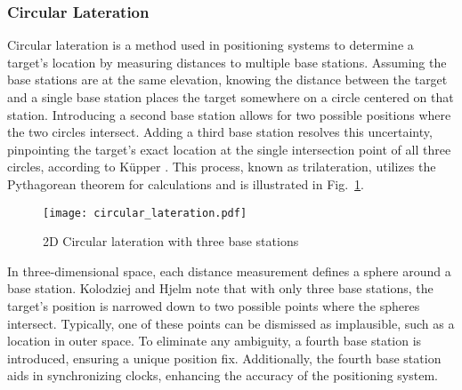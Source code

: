 \subsubsection{Circular Lateration}
Circular lateration is a method used in positioning systems to determine a target's location by measuring distances to multiple base stations. Assuming the base stations are at the same elevation, knowing the distance between the target and a single base station places the target somewhere on a circle centered on that station. Introducing a second base station allows for two possible positions where the two circles intersect. Adding a third base station resolves this uncertainty, pinpointing the target's exact location at the single intersection point of all three circles, according to K\"upper \cite{kupper2005location}. This process, known as trilateration, utilizes the Pythagorean theorem for calculations and is illustrated in Fig.~\ref{fig:circular_lateration}.

\begin{figure}[htbp]
    \centering
    \texttt{[image: circular\_lateration.pdf]}
    \caption{2D Circular lateration with three base stations \cite{kupper2005location}}
    \label{fig:circular_lateration}
\end{figure}

In three-dimensional space, each distance measurement defines a sphere around a base station. Kolodziej and Hjelm \cite{kolodziej2017local} note that with only three base stations, the target's position is narrowed down to two possible points where the spheres intersect. Typically, one of these points can be dismissed as implausible, such as a location in outer space. To eliminate any ambiguity, a fourth base station is introduced, ensuring a unique position fix. Additionally, the fourth base station aids in synchronizing clocks, enhancing the accuracy of the positioning system.

